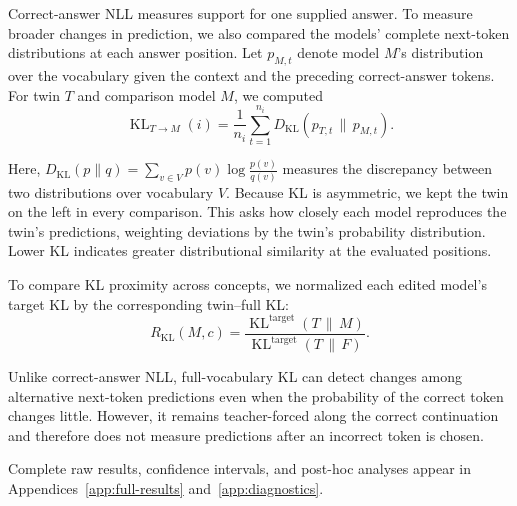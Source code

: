 Correct-answer NLL measures support for one supplied answer. To measure broader
changes in prediction, we also compared the models' complete next-token
distributions at each answer position. Let $p_{M,t}$ denote model $M$'s
distribution over the vocabulary given the context and the preceding
correct-answer tokens. For twin $T$ and comparison model $M$, we computed
\begin{equation}
\operatorname{KL}_{T\to M}(i)
=
\frac{1}{n_i}
\sum_{t=1}^{n_i}
D_{\mathrm{KL}}
\left(
p_{T,t}\,\|\,p_{M,t}
\right).
\end{equation}

Here,
$D_{\mathrm{KL}}(p\|q)=\sum_{v\in V}p(v)\log\frac{p(v)}{q(v)}$
measures the discrepancy between two distributions over vocabulary $V$.
Because KL is asymmetric, we kept the twin on the left in every comparison.
This asks how closely each model reproduces the twin's predictions, weighting
deviations by the twin's probability distribution. Lower KL indicates greater
distributional similarity at the evaluated positions.

To compare KL proximity across concepts, we normalized each edited model's
target KL by the corresponding twin--full KL:
\begin{equation}
R_{\mathrm{KL}}(M,c)
=
\frac{
\operatorname{KL}^{\mathrm{target}}(T\,\|\,M)
}{
\operatorname{KL}^{\mathrm{target}}(T\,\|\,F)
}.
\end{equation}

Unlike correct-answer NLL, full-vocabulary KL can detect changes among
alternative next-token predictions even when the probability of the correct
token changes little. However, it remains teacher-forced along the correct
continuation and therefore does not measure predictions after an incorrect
token is chosen.

Complete raw results, confidence intervals, and post-hoc analyses appear in
Appendices~\ref{app:full-results} and~\ref{app:diagnostics}.
